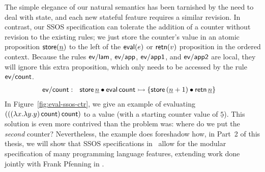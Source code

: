 The simple elegance of our natural semantics has been tarnished by the
need to deal with state, and each new stateful feature requires a
similar revision.  In contrast, our SSOS specification can tolerate
the addition of a counter without revision to the existing rules; we
just store the counter's value in an atomic proposition ${\sf
  store}(\underline{n})$ to the left of the ${\sf eval}(e)$ or ${\sf
  retn}(v)$ proposition in the ordered context. Because the rules
${\sf ev/lam}$, ${\sf ev/app}$, ${\sf ev/app1}$, and ${\sf ev/app2}$
are local, they will ignore this extra proposition, which only needs
to be accessed by the rule ${\sf ev/count}$.
\begin{align*}
{\sf ev/count} &:~~
  {\sf store}\,\underline n \mathbin{\bullet} {\sf eval}\,{\sf count}
    \rightarrowtail \{ {\sf store}\,(\underline n + 1) 
      \mathbin{\bullet} {\sf retn}\,\underline n \}
\end{align*}
In Figure~\ref{fig:eval-ssos-ctr}, we give an example of evaluating
$(((\lambda x.\lambda y.y)\,{\sf count})\,{\sf count})$ to a value
(with a starting counter value of $\underline 5$). This solution is
even more contrived than the problem was: where do we put the {\it
  second} counter? Nevertheless, the example does foreshadow how, in
Part~2 of this thesis, we will show that SSOS
specifications in \sls~allow for the modular specification of many
programming language features, extending work done jointly with
Frank Pfenning in \cite{pfenning09substructural}.

